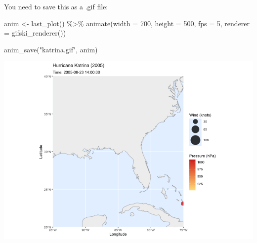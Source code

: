 \documentclass[
  letterpaper,
  DIV=11,
  numbers=noendperiod]{scrartcl}
\newenvironment{Shaded}{\begin{snugshade}}{\end{snugshade}}
\newcommand{\AttributeTok}[1]{\textcolor[rgb]{0.40,0.45,0.13}{#1}}
\newcommand{\DecValTok}[1]{\textcolor[rgb]{0.68,0.00,0.00}{#1}}
\newcommand{\FunctionTok}[1]{\textcolor[rgb]{0.28,0.35,0.67}{#1}}
\newcommand{\NormalTok}[1]{\textcolor[rgb]{0.00,0.23,0.31}{#1}}
\newcommand{\OtherTok}[1]{\textcolor[rgb]{0.00,0.23,0.31}{#1}}
\newcommand{\SpecialCharTok}[1]{\textcolor[rgb]{0.37,0.37,0.37}{#1}}
\newcommand{\StringTok}[1]{\textcolor[rgb]{0.13,0.47,0.30}{#1}}
\begin{document}
You need to save this as a .gif file:

\begin{Shaded}
\begin{Highlighting}[]
\NormalTok{anim }\OtherTok{\textless{}{-}} \FunctionTok{last\_plot}\NormalTok{() }\SpecialCharTok{\%\textgreater{}\%}
  \FunctionTok{animate}\NormalTok{(}\AttributeTok{width =} \DecValTok{700}\NormalTok{, }\AttributeTok{height =} \DecValTok{500}\NormalTok{, }\AttributeTok{fps =} \DecValTok{5}\NormalTok{, }\AttributeTok{renderer =} \FunctionTok{gifski\_renderer}\NormalTok{())}

\FunctionTok{anim\_save}\NormalTok{(}\StringTok{"katrina.gif"}\NormalTok{, anim)}
\end{Highlighting}
\end{Shaded}

\includegraphics{katrina.gif}
\end{document}
